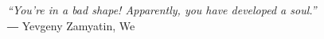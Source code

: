 \pagestyle{empty}
\chapter*{}
\vspace{17.5cm}
\vfill
\hfill
\begin{flushright}
{\it``You're in a bad shape! Apparently, you have developed a soul.''}\\
― Yevgeny Zamyatin, We
\end{flushright}
